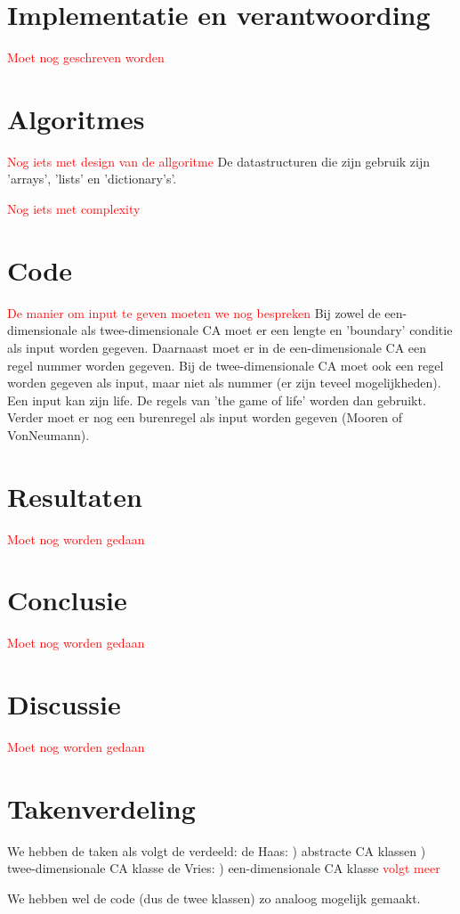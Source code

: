 \documentclass[12pt,a4paper]{article}
\begin{document}
\section*{Implementatie en verantwoording}
\textcolor{red}{Moet nog geschreven worden}


\section*{Algoritmes}
\textcolor{red}{Nog iets met design van de allgoritme}
De datastructuren die zijn gebruik zijn 'arrays', 'lists' en 'dictionary's'.

\textcolor{red}{Nog iets met complexity} 

\section*{Code}
\textcolor{red}{De manier om input te geven moeten we nog bespreken}
\newline
Bij zowel de een-dimensionale als twee-dimensionale CA moet 
er een lengte en 'boundary' conditie als input worden gegeven.
Daarnaast moet er in de een-dimensionale CA een regel nummer worden gegeven.
Bij de twee-dimensionale CA moet ook een regel worden gegeven als input, maar niet als nummer (er zijn teveel mogelijkheden).
Een input kan zijn life. De regels van 'the game of life' worden dan gebruikt.
Verder moet er nog een burenregel als input worden gegeven (Mooren of VonNeumann).


\section*{Resultaten}
\textcolor{red}{Moet nog worden gedaan}

\section*{Conclusie}
\textcolor{red}{Moet nog worden gedaan}

\section*{Discussie}
\textcolor{red}{Moet nog worden gedaan}

\section*{Takenverdeling}
We hebben de taken als volgt de verdeeld:
\vspace{6pt}
\newline
de Haas:
) abstracte CA klassen
) twee-dimensionale CA klasse
\vspace{6pt}
\newline
de Vries:
) een-dimensionale CA klasse
\newline
\textcolor{red}{volgt meer}

We hebben wel de code (dus de twee klassen) zo analoog mogelijk gemaakt.

  
\end{document}

